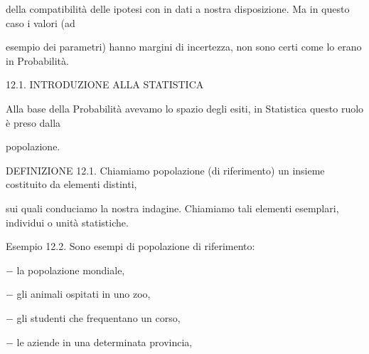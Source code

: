 \documentclass[a4paper,portrait,12pt]{article}
\begin{document}
\begin{flushleft}
della compatibilit\`{a} delle ipotesi con in dati a nostra disposizione. Ma in questo caso i valori (ad
\end{flushleft}


\begin{flushleft}
esempio dei parametri) hanno margini di incertezza, non sono certi come lo erano in Probabilit\`{a}.
\end{flushleft}





\begin{flushleft}
12.1. INTRODUZIONE ALLA STATISTICA
\end{flushleft}


\begin{flushleft}
Alla base della Probabilit\`{a} avevamo lo spazio degli esiti, in Statistica questo ruolo \`{e} preso dalla
\end{flushleft}


\begin{flushleft}
popolazione.
\end{flushleft}


\begin{flushleft}
DEFINIZIONE 12.1. Chiamiamo popolazione (di riferimento) un insieme costituito da elementi distinti,
\end{flushleft}


\begin{flushleft}
sui quali conduciamo la nostra indagine. Chiamiamo tali elementi esemplari, individui o unit\`{a} statistiche.
\end{flushleft}


\begin{flushleft}
Esempio 12.2. Sono esempi di popolazione di riferimento:
\end{flushleft}


\begin{flushleft}
$-$ la popolazione mondiale,
\end{flushleft}


\begin{flushleft}
$-$ gli animali ospitati in uno zoo,
\end{flushleft}


\begin{flushleft}
$-$ gli studenti che frequentano un corso,
\end{flushleft}


\begin{flushleft}
$-$ le aziende in una determinata provincia,
\end{flushleft}
\end{document}
